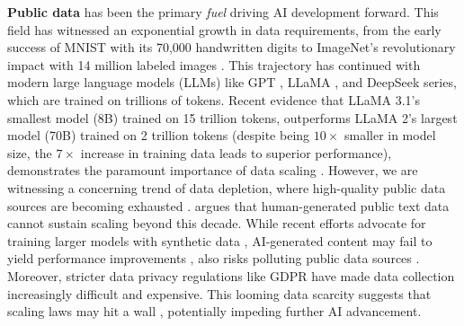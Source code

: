 \textbf{Public data} has been the primary \textit{fuel} driving AI development forward. 
This field has witnessed an exponential growth in data requirements, from the early success of MNIST \citep{lecun1998mnist} with its 70,000 handwritten digits to ImageNet's revolutionary impact with 14 million labeled images \citep{deng2009imagenet}. 
This trajectory has continued with modern large language models (LLMs) like GPT \citep{gpt}, LLaMA \citep{llama}, and DeepSeek \citep{liu2024deepseek} series, which are trained on trillions of tokens.
Recent evidence that LLaMA 3.1's smallest model (8B) \citep{meta2024llama3.1} trained on 15 trillion tokens, outperforms LLaMA 2's largest model (70B) \citep{touvron2023llama} trained on 2 trillion tokens (despite being $10 \times$ smaller in model size, the $7 \times$ increase in training data leads to superior performance), demonstrates the paramount importance of data scaling \citep{sun2017revisiting,raffel2020exploring, deeplearningai2024federated}. 
However, we are witnessing a concerning trend of data depletion, where high-quality public data sources are becoming exhausted \citep{lee2021dedup, biderman2022data}. \citet{villalobosposition} argues that human-generated public text data cannot sustain scaling beyond this decade. 
While recent efforts advocate for training larger models with synthetic data \citep{chen2024diversity}, AI-generated content may fail to yield performance improvements \citep{wenger2024ai}, also risks polluting public data sources \citep{fang2024bias}. 
Moreover, stricter data privacy regulations like GDPR \citep{gdpr} have made data collection increasingly difficult and expensive.
This looming data scarcity suggests that scaling laws may hit a wall \citep{hardy2024wall}, potentially impeding further AI advancement.




